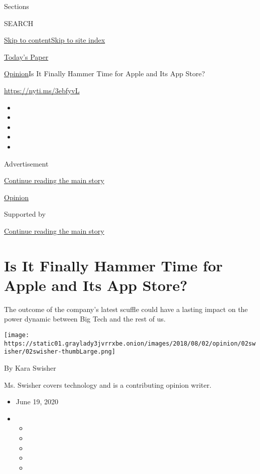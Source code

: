 Sections

SEARCH

\protect\hyperlink{site-content}{Skip to
content}\protect\hyperlink{site-index}{Skip to site index}

\href{https://myaccount.nytimes3xbfgragh.onion/auth/login?response_type=cookie\&client_id=vi}{}

\href{https://www.nytimes3xbfgragh.onion/section/todayspaper}{Today's
Paper}

\href{/section/opinion}{Opinion}\textbar{}Is It Finally Hammer Time for
Apple and Its App Store?

\url{https://nyti.ms/3ebfyvL}

\begin{itemize}
\item
\item
\item
\item
\item
\end{itemize}

Advertisement

\protect\hyperlink{after-top}{Continue reading the main story}

\href{/section/opinion}{Opinion}

Supported by

\protect\hyperlink{after-sponsor}{Continue reading the main story}

\hypertarget{is-it-finally-hammer-time-for-apple-and-its-app-store}{%
\section{Is It Finally Hammer Time for Apple and Its App
Store?}\label{is-it-finally-hammer-time-for-apple-and-its-app-store}}

The outcome of the company's latest scuffle could have a lasting impact
on the power dynamic between Big Tech and the rest of us.

\texttt{[image: https://static01.graylady3jvrrxbe.onion/images/2018/08/02/opinion/02swisher/02swisher-thumbLarge.png]}

By Kara Swisher

Ms. Swisher covers technology and is a contributing opinion writer.

\begin{itemize}
\item
  June 19, 2020
\item
  \begin{itemize}
  \item
  \item
  \item
  \item
  \item
  \end{itemize}
\end{itemize}

